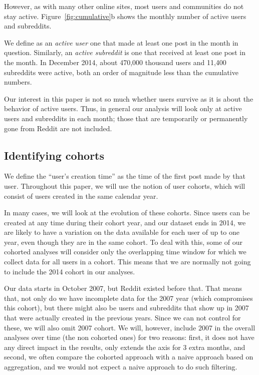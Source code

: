However, as with many other online sites, most users \cite{Scellato2011,Hughes2009,Java2007} and communities \cite{Arguello2006} do not stay active. Figure~\ref{fig:cumulative}b shows the monthly number of active users and subreddits.

We define as an \textit{active user} one that made at least one post in the month in question. Similarly, an \textit{active subreddit} is one that received at least one post in the month. In December 2014, about 470,000 thousand users and 11,400 subreddits were active, both an order of magnitude less than the cumulative numbers.  

Our interest in this paper is not so much whether users survive as it is about the behavior of active users.  Thus, 
in general our analysis will look only at active users and subreddits in each month; those that are temporarily or permanently gone from Reddit are not included.  

\subsection{Identifying cohorts}

We define the ``user's creation time'' as the time of the first post made by that user.  Throughout this paper, we will use the notion of user cohorts, which will consist of users created in the same calendar year.

In many cases, we will look at the evolution of these cohorts. Since users can be created at any time during their cohort year, and our dataset ends in 2014, 
we are likely to have a variation on the data available for each user of up to one year, even though they are in the same cohort.  To deal with this, some of our cohorted analyses will consider only the overlapping time window for which we collect data for all users in a cohort.   This means that we are normally not going to include the 2014 cohort in our analyses.

Our data starts in October 2007, but Reddit existed before that. That means that, not only do we have incomplete data for the 2007 year (which compromises this cohort), but there might also be users and subreddits that show up in 2007 that were actually created in the previous years. Since we can not control for these, we will also omit 2007 cohort. We will, however, include 2007 in the overall analyses over time (the non cohorted ones) for two reasons: first, it does not have any direct impact in the results, only extends the axis for 3 extra months, and second, we often compare the cohorted approach with a naive approach based on aggregation, and we would not expect a naive approach to do such filtering. 
